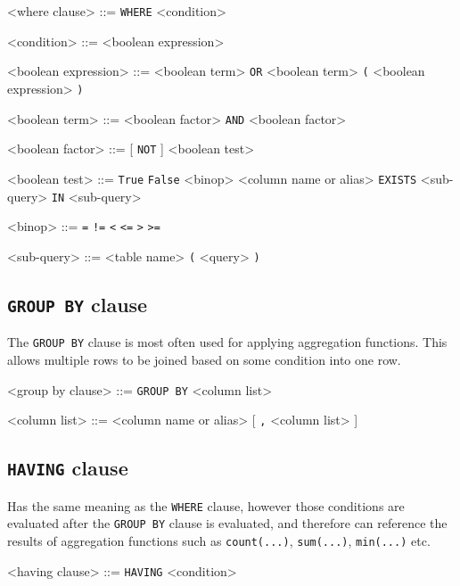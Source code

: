 \documentclass[magisterska,en]{pracamgr}
\newcommand{\code}[1]{\texttt{#1}}
\begin{document}
\begin{grammar}
<where clause> ::= \code{WHERE} <condition>

<condition> ::= <boolean expression>

<boolean expression> ::= <boolean term>
     \code{OR} <boolean term>
    \alt \code {(} <boolean expression> \code{)}

<boolean term> ::= <boolean factor>
     \code{AND} <boolean factor>

<boolean factor> ::= [ \code{NOT} ] <boolean test>

<boolean test> ::= \code{True}
    \alt \code{False}
     <binop> <column name or alias>
    \alt [ \code{NOT} ] \code{EXISTS} <sub-query>
    \alt <column name or alias> [ \code{NOT} ] \code{IN} <sub-query>
    
<binop> ::= \code{=}
    \alt \code{!=}
    \alt \code{\textless}
    \alt \code{\textless=}
    \alt \code{>}
    \alt \code{>=}

<sub-query> ::= <table name>
    \alt \code{(} <query> \code{)}
\end{grammar}


\subsection{\code{GROUP BY} clause}

The \code{GROUP BY} clause is most often used for applying aggregation functions. This allows multiple rows to be joined based on some condition into one row.

\begin{grammar}
<group by clause> ::= \code{GROUP BY} <column list>

<column list> ::= <column name or alias> [ \code{,} <column list> ]
\end{grammar}


\subsection{\code{HAVING} clause}

Has the same meaning as the \code{WHERE} clause, however those conditions are evaluated after the \code{GROUP BY} clause is evaluated, and therefore can reference the results of aggregation functions such as \code{count(...)}, \code{sum(...)}, \code{min(...)} etc.

\begin{grammar}
<having clause> ::= \code{HAVING} <condition>
\end{grammar}
\end{document}
